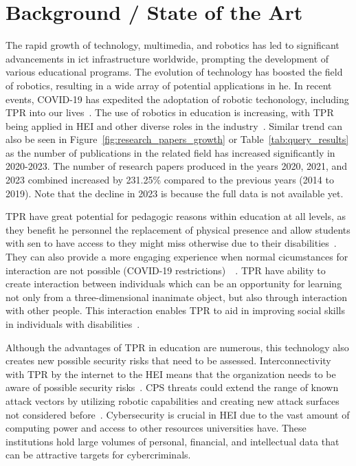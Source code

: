
\newpage


\section{Background / State of the Art}

The rapid growth of technology, multimedia, and robotics has led to significant advancements in \ac{ict} infrastructure worldwide, prompting
the development of various educational programs. The
evolution
of technology has boosted the field
of robotics,
resulting in a
wide array
of potential applications in \ac{he}. In recent events, COVID-19 has expedited the adoptation of robotic techonology, including \ac{TPR}
into
our lives~\cite[193]{humans_and_robots_relation_2021}. The
use
of robotics in education is
increasing,
with \ac{TPR} being applied in \ac{HEI} and other diverse roles in the industry~\cite[]{telepresence_robots_in_classroom_2019,
  higher_edu_perception_on_tprs_2022}. Similar trend can also be seen in Figure~\ref{fig:research_papers_growth} or Table~\ref{tab:query_results} as the
number of publications in the related field has increased significantly in 2020-2023. The number of research papers produced in the years 2020, 2021, and 2023 combined increased by 231.25\% compared to
the previous years (2014 to 2019). Note that the decline in 2023 is because the full data is not available yet.




\ac{TPR} have great potential for pedagogic reasons within education at all levels, as they benefit \ac{he} personnel the replacement of
physical
presence and allow students with \ac{sen} to have access to  they might miss otherwise due to their disabilities~\cite[546]{
  telepresence_robots_in_classroom_2019}. They can also provide a more engaging experience when normal cicumstances for interaction are not
possible (COVID-19 restrictions)~\cite[197]{humans_and_robots_relation_2021}~\cite[1]{higher_edu_perception_on_tprs_2022}.
\ac{TPR} have ability to create interaction between individuals which can be an opportunity for learning not only from a three-dimensional
inanimate
object, but also through interaction with other people. This interaction enables \ac{TPR} to aid in improving social
skills in individuals with disabilities~\cite[541]{telepresence_robots_in_classroom_2019}.

Although the advantages of \ac{TPR} in education are numerous, this technology also creates new possible security risks that need to be
assessed. Interconnectivity with \ac{TPR} by the internet to the \ac{HEI} means that the organization needs to be aware of possible
security risks~\cite[120]{robotics_cyber_security_2022}. \ac{CPS} threats could extend the range of known attack vectors by
utilizing robotic capabilities and creating new attack surfaces not considered before~\cite[18-19]{analyzing_cyber_physical_threats_2018}.
Cybersecurity
is crucial in \ac{HEI} due
to the vast amount
of computing power and access to other resources
universities
have. These institutions hold large volumes of personal, financial, and intellectual data that can be attractive targets for cybercriminals.


